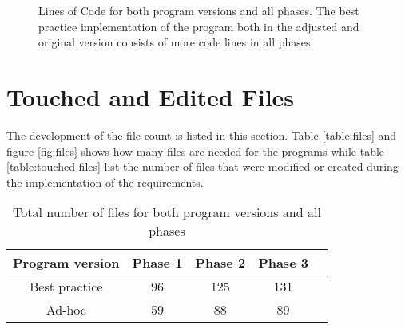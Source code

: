 \begin{figure}[htbp]
	\centering

	\caption{Lines of Code for both program versions and all phases. The best practice implementation of the program both in the adjusted and original version consists of more code lines in all phases.}
	\label{fig:lines-of-code}
\end{figure}


\section{Touched and Edited Files}
\label{sec:file-count}
The development of the file count is listed in this section. Table \ref{table:files} and figure \ref{fig:files} shows how many files are needed for the programs while table \ref{table:touched-files} list the number of files that were modified or created during the implementation of the requirements.

\begin{table}
	\centering

	\begin{tabular}{|c|c|c|c|c|} \hline
		\textbf{Program version} &\textbf{Phase 1} & \textbf{Phase 2} & \textbf{Phase 3} \\ \hline
		Best practice & 96 & 125 & 131 \\ \hline
		Ad-hoc & 59 & 88 & 89 \\ \hline
	\end{tabular}
	\caption{Total number of files for both program versions and all phases}
\end{table}

